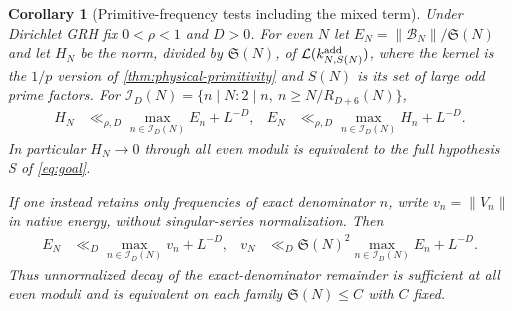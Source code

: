 \documentclass[11pt,a4paper]{article}
\numberwithin{equation}{section}
\newtheorem{corollary}[theorem]{Corollary}
\newcommand{\SSS}{\mathfrak S}
\newcommand{\B}{\mathcal B_N}
\begin{document}
\begin{corollary}[Primitive-frequency tests including the mixed term]
\label{cor:full-primitive-sines}
Under Dirichlet GRH fix $0<\rho<1$ and $D>0$. For even $N$
let $E_N=\|\B\|/\SSS(N)$ and let $H_N$ be the norm, divided by
$\SSS(N)$, of $\mathcal L(k_{N,S(N)}^{\rm add})$, where the
kernel is the $1/p$ version of \cref{thm:physical-primitivity}
and $S(N)$ is its set of large odd prime factors. For
$\mathcal I_D(N)=\{n\mid N:2\mid n,\ n\ge N/R_{D+6}(N)\}$,
\begin{align}
 H_N&\ll_{\rho,D}\max_{n\in\mathcal I_D(N)}E_n+L^{-D},
 &E_N&\ll_{\rho,D}\max_{n\in\mathcal I_D(N)}H_n+L^{-D}.
 \label{eq:full-local-sine-transfer}
\end{align}
In particular $H_N\to0$ through all even moduli is equivalent
to the full hypothesis S of \eqref{eq:goal}.

If one instead retains only frequencies of \emph{exact}
denominator $n$, write $v_n=\|V_n\|$ in native energy, without
singular-series normalization. Then
\begin{align}
 E_N&\ll_D\max_{n\in\mathcal I_D(N)}v_n+L^{-D},
 &v_N&\ll_D\SSS(N)^2\max_{n\in\mathcal I_D(N)} E_n+L^{-D}.
 \label{eq:full-exact-sine-transfer}
\end{align}
Thus unnormalized decay of the exact-denominator remainder is
sufficient at all even moduli and is equivalent on each family
$\SSS(N)\le C$ with $C$ fixed.
\end{corollary}
\end{document}
